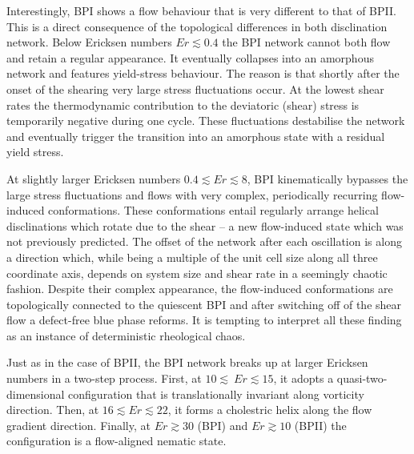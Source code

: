 \documentclass[aps,pre,reprint,superscriptaddress, twocolumn]{revtex4}
\begin{document}
Interestingly, BPI shows a flow behaviour that is very different to that of BPII.
This is a direct consequence of the topological differences in both disclination 
network. Below Ericksen numbers $Er\lesssim0.4$ the BPI network cannot both flow and 
retain a regular appearance. It eventually collapses into an amorphous network and 
features yield-stress behaviour. The reason is that shortly after the onset of the shearing 
very large stress fluctuations occur. At the lowest shear rates
the thermodynamic contribution to the deviatoric (shear) stress is temporarily 
negative during one cycle. These fluctuations destabilise the network and 
eventually trigger the transition into an amorphous state with a residual yield
stress. 

At slightly larger Ericksen numbers $0.4\lesssim Er \lesssim8$,
BPI kinematically bypasses the large stress fluctuations and 
flows with very complex, periodically recurring flow-induced conformations.
These conformations entail regularly arrange helical disclinations which 
rotate due to the shear -- a new flow-induced state which was not previously
predicted. 
The offset of the network after each oscillation is along a direction which,
while being a multiple of the unit cell size along all three coordinate
axis, depends on system size and shear rate in a seemingly chaotic fashion.
Despite their complex appearance, the flow-induced conformations are 
topologically connected to the quiescent BPI and after switching off of the 
shear flow a defect-free blue phase reforms. It is tempting to
interpret all these finding as an instance of 
deterministic rheological chaos.

Just as in the case of BPII, the BPI network breaks up at larger Ericksen numbers in
a two-step process. First, at $10\lesssim\ Er\lesssim 15$, it adopts a 
quasi-two-dimensional configuration that is translationally invariant along vorticity direction. 
Then, at $16\lesssim Er \lesssim 22$, it forms a cholestric helix along the flow gradient 
direction.  Finally, at $Er\gtrsim30$ (BPI) and $Er\gtrsim10$ (BPII) the configuration
is a flow-aligned nematic state.


%
\end{document}
